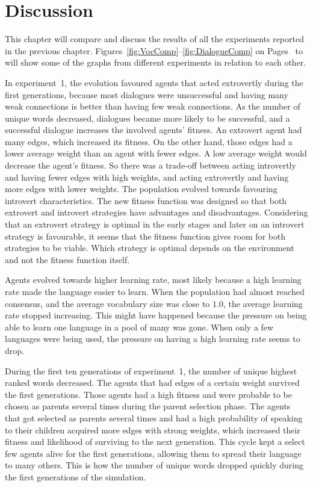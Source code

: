 \acresetall
\chapter{Discussion}\label{ch:Discussion}
This chapter will compare and discuss the results of all the experiments reported in the previous chapter. Figures~\ref{fig:VocComp}--\ref{fig:DialogueComp} on Pages~\pageref{fig:VocComp} to \pageref{fig:DialogueComp} will show some of the graphs from different experiments in relation to each other.  

In experiment~1, the evolution favoured agents that acted extrovertly during the first generations, because most dialogues were unsuccessful and having many weak connections is better than having few weak connections. As the number of unique words decreased, dialogues became more likely to be successful, and a successful dialogue increases the involved agents' fitness. An extrovert agent had many edges, which increased its fitness. On the other hand, those edges had a lower average weight than an agent with fewer edges. A low average weight would decrease the agent's fitness. So there was a trade-off between acting introvertly and having fewer edges with high weights, and acting extrovertly and having more edges with lower weights. The population evolved towards favouring introvert characteristics. The new fitness function was designed so that both extrovert and introvert strategies have advantages and disadvantages. Considering that an extrovert strategy is optimal in the early stages and later on an introvert strategy is favourable, it seems that the fitness function gives room for both strategies to be viable. Which strategy is optimal depends on the environment and not the fitness function itself. 

Agents evolved towards higher learning rate, most likely because a high learning rate made the language easier to learn. When the population had almost reached consensus, and the average vocabulary size was close to $1.0$, the average learning rate stopped increasing. This might have happened because the pressure on being able to learn one language in a pool of many was gone. When only a few languages were being used, the pressure on having a high learning rate seems to drop. 

During the first ten generations of experiment~1, the number of unique highest ranked words decreased. The agents that had edges of a certain weight survived the first generations. Those agents had a high fitness and were probable to be chosen as parents several times during the parent selection phase. The agents that got selected as parents several times and had a high probability of speaking to their children acquired more edges with strong weights, which increased their fitness and likelihood of surviving to the next generation. This cycle kept a select few agents alive for the first generations, allowing them to spread their language to many others. This is how the number of unique words dropped quickly during the first generations of the simulation. 

